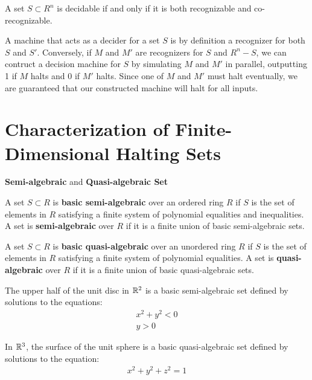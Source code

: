 \begin{proposition}{A set $S \subset R^n$ is decidable if and only if it is
  both recognizable and co-recognizable.}
\label{prop:dec=rec+corec}
\end{proposition}
\begin{proofsketch}
  
  A machine that acts as a decider for a set $S$ is by definition a
  recognizer for both $S$ and $S'$.  Conversely, if $M$ and $M'$ are
  recognizers for $S$ and $R^n - S$, we can contruct a decision
  machine for $S$ by simulating $M$ and $M'$ in parallel, outputting 1
  if $M$ halts and 0 if $M'$ halts.  Since one of $M$ and $M'$ must
  halt eventually, we are guaranteed that our constructed machine will
  halt for all inputs.


\end{proofsketch}

\section{Characterization of Finite-Dimensional Halting Sets}

  \begin{definition}{\textbf{Semi-algebraic} and \textbf{Quasi-algebraic Set}}
    
    A set $S \subset R$ is \textbf{basic semi-algebraic} over an
    ordered ring $R$ if $S$ is the set of elements in $R$ satisfying
    a finite system of polynomial equalities and inequalities. A set
    is \textbf{semi-algebraic} over $R$ if it is a finite union of basic
    semi-algebraic sets.
    
    A set $S \subset R$ is \textbf{basic quasi-algebraic} over an
    unordered ring $R$ if $S$ is the set of elements in $R$ satisfying
    a finite system of polynomial equalities. A set is
    \textbf{quasi-algebraic} over $R$ if it is a finite union of basic
    quasi-algebraic sets.
    
  \end{definition}

  \begin{example}
    The upper half of the unit disc in $\mathbb{R}^2$ is a basic
    semi-algebraic set defined by solutions to the equations:
    \begin{eqnarray*}
      x^2 + y^2 < 0\\
      y > 0
    \end{eqnarray*}

    In $\mathbb{R}^3$, the surface of the unit sphere is a basic
    quasi-algebraic set defined by solutions to the equation:
    \begin{eqnarray*}
      x^2 + y^2 + z^2 = 1
    \end{eqnarray*}
  \end{example}

